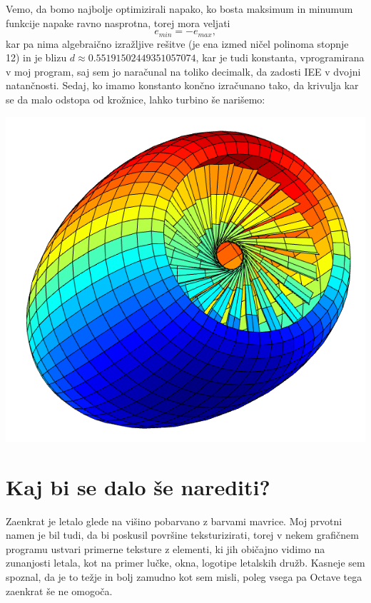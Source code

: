 \documentclass[a4paper,11pt]{article}
\begin{document}
	Vemo, da bomo najbolje optimizirali napako, ko bosta maksimum in minumum funkcije napake ravno nasprotna, torej mora veljati
	$$
		e_{min} = -e_{max},
	$$
	kar pa nima algebraično izražljive rešitve (je ena izmed ničel polinoma stopnje 12) in je blizu $d \approx 0.55191502449351057074$, kar je tudi konstanta, vprogramirana v moj program, saj sem jo naračunal na toliko decimalk, da zadosti IEE v dvojni natančnosti. Sedaj, ko imamo konstanto končno izračunano tako, da krivulja kar se da malo odstopa od krožnice, lahko turbino še narišemo:
	
	\includegraphics[scale=0.55]{turbina}
	
	\section{Kaj bi se dalo še narediti?}
	
	Zaenkrat je letalo glede na višino pobarvano z barvami mavrice. Moj prvotni namen je bil tudi, da bi poskusil površine teksturizirati, torej v nekem grafičnem programu ustvari primerne teksture z elementi, ki jih običajno vidimo na zunanjosti letala, kot na primer lučke, okna, logotipe letalskih družb. Kasneje sem spoznal, da je to težje in bolj zamudno kot sem misli, poleg vsega pa Octave tega zaenkrat še ne omogoča.
	
\end{document}
